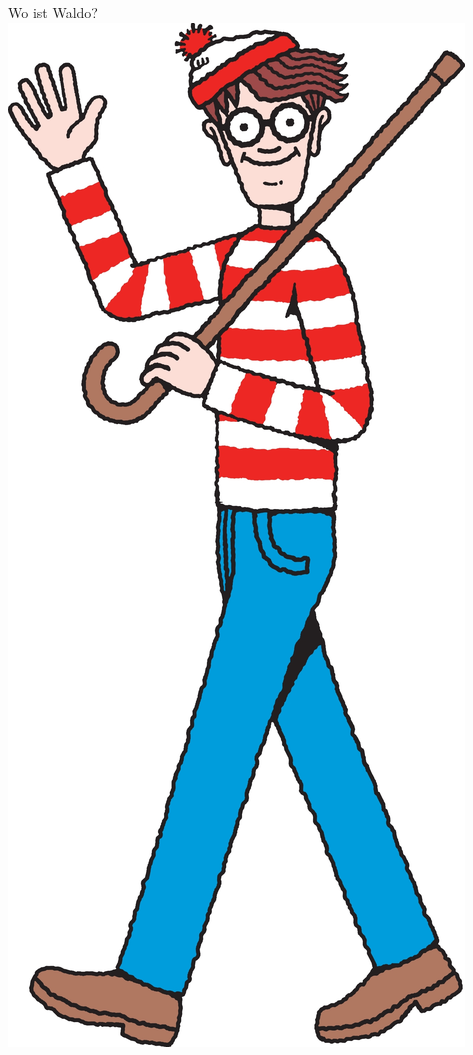 \documentclass[12pt,compress,ngerman,utf8,t]{beamer}
\begin{document}
\begin{frame}{Wo ist Waldo?}
  \centering
  \includegraphics[height=0.8\textheight]{waldo}
\end{frame}
\end{document}
